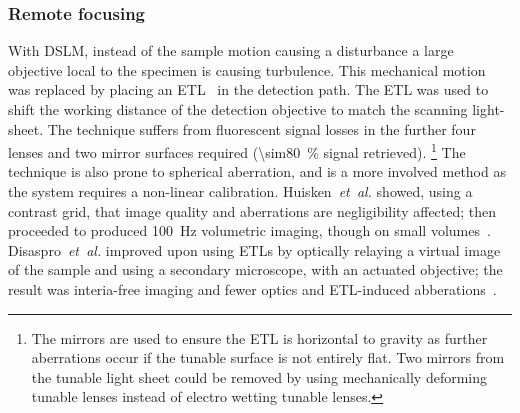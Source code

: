 \subsubsection{Remote focusing}

With \gls{DSLM}, instead of the sample motion causing a disturbance a large objective local to the specimen is causing turbulence.
This mechanical motion was replaced by placing an
\gls{ETL}~\cite{fahrbachRapid3DLightsheet2013} in the detection path.
The \gls{ETL} was used to shift the \gls{working distance} of the detection objective to match the scanning \gls{light-sheet}.
The technique suffers from fluorescent signal losses in the further four lenses and two mirror surfaces required (\SI{\sim80}{\%} signal retrieved).
\footnote{The mirrors are used to ensure the \gls{ETL} is horizontal to gravity as further aberrations occur if the tunable surface is not entirely flat.
Two mirrors from the tunable light sheet could be removed by using mechanically deforming tunable lenses instead of electro wetting tunable lenses.}
The technique is also prone to spherical aberration, and is a more involved method as the system requires a non-linear calibration.
Huisken~\emph{et~al.} showed, using a contrast grid, that image quality and aberrations are negligibility affected; then proceeded to produced \SI{100}{\hertz} volumetric imaging, though on small volumes~\cite{fahrbachRapid3DLightsheet2013}.
Disaspro~\emph{et~al.} improved upon using \gls{ETL}s by optically relaying a virtual image of the sample and using a secondary microscope, with an actuated objective; the result was interia-free imaging and fewer optics and \gls{ETL}-induced abberations~\cite{duocastellaFastInertiaFreeVolumetric2017c}.




